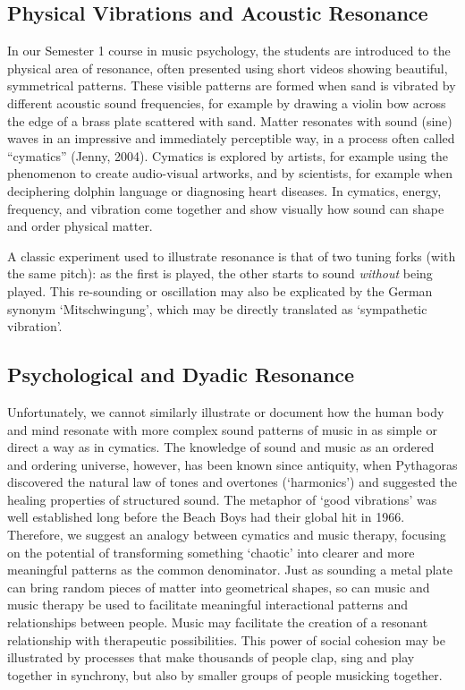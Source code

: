 \begin{adjmulticols}{2}{0mm}{0mm}
\subsection{Physical Vibrations and Acoustic Resonance}
In our Semester 1 course in music psychology, the students are introduced to the physical area of resonance, often presented using short videos showing beautiful, symmetrical patterns.%
These visible patterns are formed when sand is vibrated by different acoustic sound frequencies, for example by drawing a violin bow across the edge of a brass plate scattered with sand. Matter resonates with sound (sine) waves in an impressive and immediately perceptible way, in a process often called \enquote{cymatics} (Jenny, 2004).  Cymatics is explored by artists, for example using the phenomenon to create audio-visual artworks, and by scientists, for example when deciphering dolphin language or diagnosing heart diseases. In cymatics, energy, frequency, and vibration come together and show visually how sound can shape and order physical matter.%
\par
A classic experiment used to illustrate resonance is that of two tuning forks (with the same pitch): as the first is played, the other starts to sound \textit{without} being played. This re-sounding or oscillation may also be explicated by the German synonym ‘Mitschwingung’, which may be directly translated as ‘sympathetic vibration’.

\subsection{Psychological and Dyadic Resonance}
Unfortunately, we cannot similarly illustrate or document how the human body and mind resonate with more complex sound patterns of music in as simple or direct a way as in cymatics. The knowledge of sound and music as an ordered and ordering universe, however, has been known since antiquity, when Pythagoras discovered the natural law of tones and overtones (‘harmonics’) and suggested the healing properties of structured sound. The metaphor of ‘good vibrations’ was well established long before the Beach Boys had their global hit in 1966. Therefore, we suggest an analogy between cymatics and music therapy, focusing on the potential of transforming something ‘chaotic’ into clearer and more meaningful patterns as the common denominator. Just as sounding a metal plate can bring random pieces of matter into geometrical shapes, so can music and music therapy be used to facilitate meaningful interactional patterns and relationships between people. Music may facilitate the creation of a resonant relationship with therapeutic possibilities. This power of social cohesion may be illustrated by processes that make thousands of people clap, sing and play%
together in synchrony, but also by smaller groups of people musicking together.


\end{adjmulticols}
